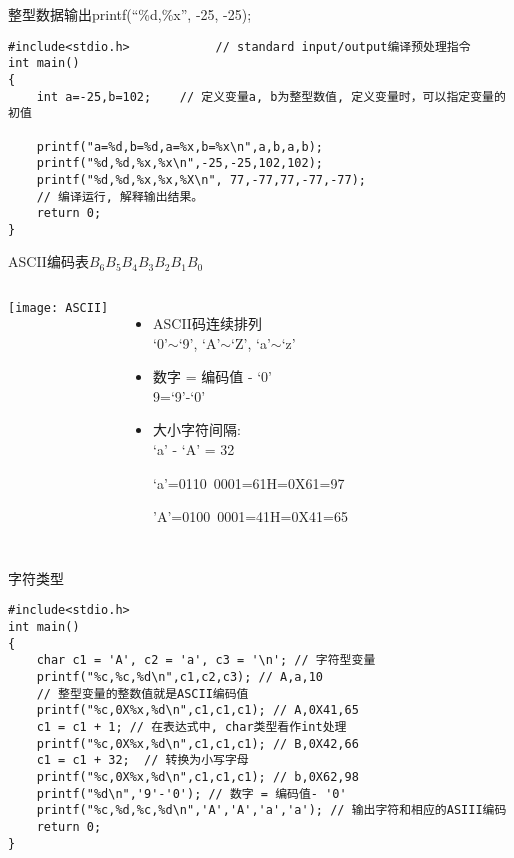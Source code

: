 
\begin{frame}{整型数据输出printf(``\%d,\%x'', -25, -25);}
\begin{lstlisting}
#include<stdio.h>            // standard input/output编译预处理指令
int main()                   
{                            
	int a=-25,b=102;    // 定义变量a, b为整型数值, 定义变量时，可以指定变量的初值
	
	printf("a=%d,b=%d,a=%x,b=%x\n",a,b,a,b); 
	printf("%d,%d,%x,%x\n",-25,-25,102,102); 
	printf("%d,%d,%x,%x,%X\n", 77,-77,77,-77,-77);
	// 编译运行, 解释输出结果。
	return 0;                
}                            
\end{lstlisting}
\end{frame}

\begin{frame}{ASCII编码表$B_6B_5B_4B_3B_2B_1B_0$}
\begin{columns}
	\texttt{[image: ASCII]}
	\begin{itemize}
		\item ASCII码连续排列 \\
		`0'$\sim$`9', `A'$\sim$`Z', `a'$\sim$`z'
		\item 数字 = 编码值 - `0' \\
		9=`9'-`0'
		\item 大小字符间隔: \\
		`a' - `A' = 32
		
		\scriptsize{
			`a'=0110~0001=61H=0X61=97
			
			'A'=0100~0001=41H=0X41=65}
	\end{itemize}	
\end{columns}
\end{frame}

\begin{frame}{字符类型}
\begin{lstlisting}
#include<stdio.h>           
int main()                   
{                            
	char c1 = 'A', c2 = 'a', c3 = '\n'; // 字符型变量
	printf("%c,%c,%d\n",c1,c2,c3); // A,a,10
	// 整型变量的整数值就是ASCII编码值
	printf("%c,0X%x,%d\n",c1,c1,c1); // A,0X41,65
	c1 = c1 + 1; // 在表达式中, char类型看作int处理
	printf("%c,0X%x,%d\n",c1,c1,c1); // B,0X42,66
	c1 = c1 + 32;  // 转换为小写字母
	printf("%c,0X%x,%d\n",c1,c1,c1); // b,0X62,98
	printf("%d\n",'9'-'0'); // 数字 = 编码值- '0'
	printf("%c,%d,%c,%d\n",'A','A','a','a'); // 输出字符和相应的ASIII编码
	return 0;           
}                            
\end{lstlisting}
\end{frame}


